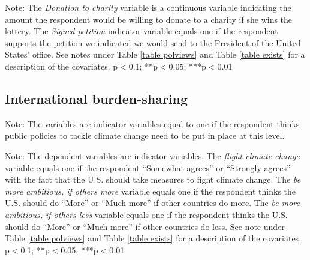 \documentclass{article}
\begin{document}
\begin{table}[h!]
	\caption{Altruism}
	\begin{center}
		\scalebox{0.7}{}
	\end{center}
	{\footnotesize Note: The \textit{Donation to charity \textdollar} variable is a continuous variable indicating the amount the respondent would be willing to donate to a charity if she wins the  lottery. The \textit{Signed petition} indicator variable equals one if the respondent supports the petition we indicated we would send to the President of the United States’ office. See notes under Table \ref{table polviews} and Table \ref{table exists} for a description of the covariates.
	\newline *p$<$0.1; **p$<$0.05; ***p$<$0.01}
\end{table}	



\clearpage
\subsection{International burden-sharing}



\begin{table}[h!]
	\caption{Best level to implement policies to tackle climate change}
	\begin{center}
		\scalebox{0.7}{}
	\end{center}
	{\footnotesize Note: The variables are indicator variables equal to one if the respondent thinks public policies to tackle climate change need to be put in place at this level.}
\end{table}	

\begin{table}[h!]
	\caption{How should the U.S. act}
	\begin{center}
		\scalebox{0.7}{}
	\end{center}
	{\footnotesize Note: The dependent variables are indicator variables. The \textit{flight climate change} variable equals one if the respondent ``Somewhat agrees'' or ``Strongly agrees'' with the fact that the U.S. should take measures to fight climate change. The \textit{be more ambitious, if others more} variable equals one if the respondent thinks the U.S. should do ``More'' or ``Much more'' if other countries do more. The \textit{be more ambitious, if others less} variable equals one if the respondent thinks the U.S. should do ``More'' or ``Much more'' if other countries do less. See note under Table \ref{table polviews} and Table \ref{table exists} for a description of the covariates.
	\newline *p$<$0.1; **p$<$0.05; ***p$<$0.01}
\end{table}	
\end{document}

